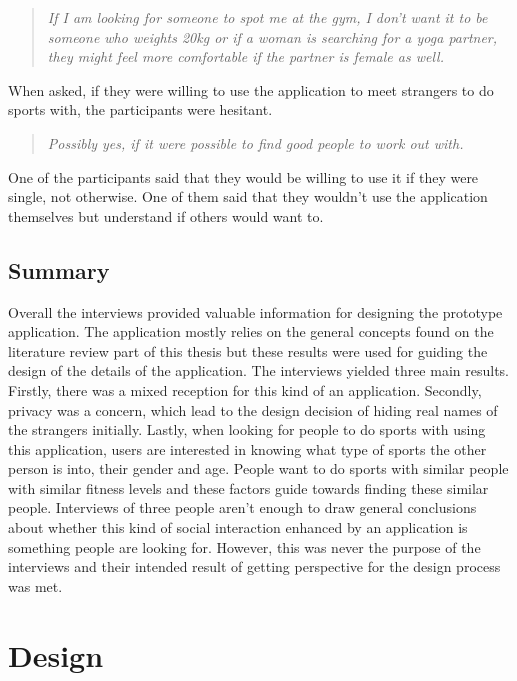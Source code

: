 \begin{quotation}
\it If I am looking for someone to spot me at the gym, I don't want it to be someone who weights 20kg or if a woman is searching for a yoga partner, they might feel more comfortable if the partner is female as well.
\end{quotation}

When asked, if they were willing to use the application to meet strangers to do sports with, the participants were hesitant.

\begin{quotation}
\it Possibly yes, if it were possible to find good people to work out with.
\end{quotation}

One of the participants said that they would be willing to use it if they were single, not otherwise. One of them said that they wouldn't use the application themselves but understand if others would want to.

\subsection{Summary}

Overall the interviews provided valuable information for designing the prototype application. The application mostly relies on the general concepts found on the literature review part of this thesis but these results were used for guiding the design of the details of the application. The interviews yielded three main results. Firstly, there was a mixed reception for this kind of an application. Secondly, privacy was a concern, which lead to the design decision of hiding real names of the strangers initially. Lastly, when looking for people to do sports with using this application, users are interested in knowing what type of sports the other person is into, their gender and age. People want to do sports with similar people with similar fitness levels and these factors guide towards finding these similar people. Interviews of three people aren't enough to draw general conclusions about whether this kind of social interaction enhanced by an application is something people are looking for. However, this was never the purpose of the interviews and their intended result of getting perspective for the design process was met.

\clearpage
\section{Design}

